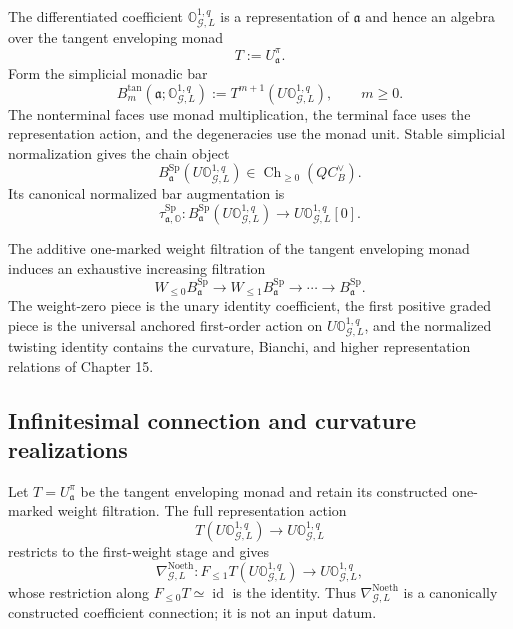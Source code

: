 \begin{construction}
\label{constr:symmetry-noether-tangent-representation-spencer-chain-object}
The differentiated coefficient
$\mathbb O_{\mathcal G,L}^{1,q}$ is a representation of $\mathfrak a$ and hence
an algebra over the tangent enveloping monad
\[
T:=U^\pi_{\mathfrak a}.
\]
Form the simplicial monadic bar
\[
B^{\mathrm{tan}}_m
\left(
\mathfrak a;\mathbb O_{\mathcal G,L}^{1,q}
\right)
:=
T^{m+1}
\left(
U\mathbb O_{\mathcal G,L}^{1,q}
\right),
\qquad m\ge0.
\]
The nonterminal faces use monad multiplication, the terminal face uses the
representation action, and the degeneracies use the monad unit.  Stable
simplicial normalization gives the chain object
\[
\boxed{
B^{\mathrm{Sp}}_{\mathfrak a}
\left(
U\mathbb O_{\mathcal G,L}^{1,q}
\right)
\in
\operatorname{Ch}_{\ge0}(QC_B^\vee).
}
\]
Its canonical normalized bar augmentation is
\[
\tau^{\mathrm{Sp}}_{\mathfrak a,\mathbb O}:
B^{\mathrm{Sp}}_{\mathfrak a}
\left(
U\mathbb O_{\mathcal G,L}^{1,q}
\right)
\longrightarrow
U\mathbb O_{\mathcal G,L}^{1,q}[0].
\]
\end{construction}

\begin{proposition}
\label{prop:symmetry-noether-weight-filtration-of-the-representation-bar}
The additive one-marked weight filtration of the tangent enveloping monad induces
an exhaustive increasing filtration
\[
W_{\le0}B^{\mathrm{Sp}}_{\mathfrak a}
\longrightarrow
W_{\le1}B^{\mathrm{Sp}}_{\mathfrak a}
\longrightarrow\cdots
\longrightarrow
B^{\mathrm{Sp}}_{\mathfrak a}.
\]
The weight-zero piece is the unary identity coefficient, the first positive
graded piece is the universal anchored first-order action on
$U\mathbb O_{\mathcal G,L}^{1,q}$, and the normalized twisting identity contains
the curvature, Bianchi, and higher representation relations of Chapter 15.
\end{proposition}


\subsection{Infinitesimal connection and curvature realizations}
\label{subsec:symmetry-noether-infinitesimal-connection-and-curvature-realizations}

\begin{construction}
\label{constr:symmetry-noether-canonical-noether-coefficient-connection}
Let $T=U^\pi_{\mathfrak a}$ be the tangent enveloping monad and retain its constructed
one-marked weight filtration.  The full representation action
\[
T\left(U\mathbb O_{\mathcal G,L}^{1,q}\right)
\longrightarrow
U\mathbb O_{\mathcal G,L}^{1,q}
\]
restricts to the first-weight stage and gives
\[
\boxed{
\nabla_{\mathcal G,L}^{\mathrm{Noeth}}:
F_{\le1}T\left(U\mathbb O_{\mathcal G,L}^{1,q}\right)
\longrightarrow
U\mathbb O_{\mathcal G,L}^{1,q},
}
\]
whose restriction along
$F_{\le0}T\simeq\operatorname{id}$ is the identity.  Thus
$\nabla_{\mathcal G,L}^{\mathrm{Noeth}}$ is a canonically constructed coefficient
connection; it is not an input datum.
\end{construction}

